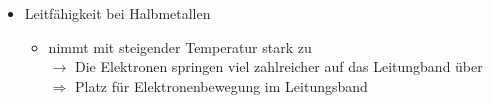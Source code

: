     \begin{itemize}
        \item Leitfähigkeit bei Halbmetallen 
        \begin{itemize}
            \item nimmt mit steigender Temperatur stark zu\\$\rightarrow$ Die Elektronen springen viel zahlreicher auf das Leitungband über\\$\Rightarrow$ Platz für Elektronenbewegung im Leitungsband
        \end{itemize}
    \end{itemize}
